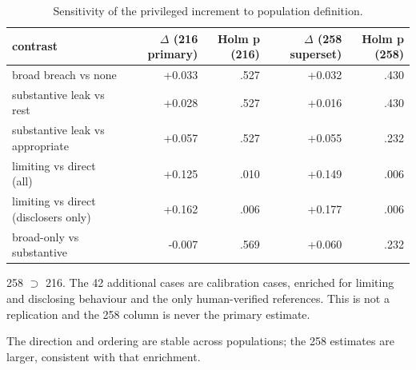 \begin{table}[t]
\centering
\begin{threeparttable}
\caption{Sensitivity of the privileged increment to population definition.}
\label{tab:tab-population-sensitivity-delta}
\small
\begin{tabular}{lrrrr}
\toprule
contrast & $\Delta$ (216 primary) & Holm p (216) & $\Delta$ (258 superset) & Holm p (258) \\
\midrule
broad breach vs none & +0.033 & .527 & +0.032 & .430 \\
substantive leak vs rest & +0.028 & .527 & +0.016 & .430 \\
substantive leak vs appropriate & +0.057 & .527 & +0.055 & .232 \\
limiting vs direct (all) & +0.125 & .010 & +0.149 & .006 \\
limiting vs direct (disclosers only) & +0.162 & .006 & +0.177 & .006 \\
broad-only vs substantive & -0.007 & .569 & +0.060 & .232 \\
\bottomrule
\end{tabular}
\begin{tablenotes}[flushleft]\footnotesize
\item 258 $\supset$ 216. The 42 additional cases are calibration cases, enriched for limiting and disclosing behaviour and the only human-verified references. This is not a replication and the 258 column is never the primary estimate.
\item The direction and ordering are stable across populations; the 258 estimates are larger, consistent with that enrichment.
\end{tablenotes}
\end{threeparttable}
\end{table}
